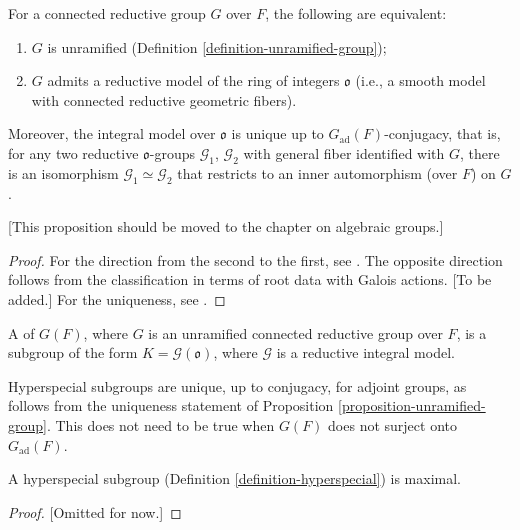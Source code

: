\begin{proposition}
 \label{proposition-unramified-group}
For a connected reductive group $G$ over $F$, the following are equivalent:
\begin{enumerate}
 \item $G$ is unramified (Definition \ref{definition-unramified-group});
 \item $G$ admits a reductive model of the ring of integers $\mathfrak o$ (i.e., a smooth model with connected reductive geometric fibers).
\end{enumerate}
Moreover, the integral model over $\mathfrak o$ is unique up to $G_{\text{ad}}(F)$-conjugacy, that is, for any two reductive $\mathfrak o$-groups $\mathcal G_1$, $\mathcal G_2$ with general fiber identified with $G$, there is an isomorphism $\mathcal G_1 \simeq \mathcal G_2$ that restricts to an inner automorphism (over $F$) on $G$.
\end{proposition}

[This proposition should be moved to the chapter on algebraic groups.]

\begin{proof}
 For the direction from the second to the first, see \cite[Corollary 5.2.14]{Conrad-RGS}. The opposite direction follows from the classification in terms of root data with Galois actions. [To be added.] For the uniqueness, see \cite[Theorem 7.2.16]{Conrad-RGS}.
\end{proof}


\begin{definition}
 \label{definition-hyperspecial}
A  of $G(F)$, where $G$ is an unramified connected reductive group over $F$, is a subgroup of the form $K = \mathcal G (\mathfrak o)$, where $\mathcal G$ is a reductive integral model.
\end{definition}

Hyperspecial subgroups are unique, up to conjugacy, for adjoint groups, as follows from the uniqueness statement of Proposition \ref{proposition-unramified-group}. This does not need to be true when $G(F)$ does not surject onto $G_{\text{ad}}(F)$.

\begin{proposition}
 \label{proposition-hyperspecial-maximal}
A hyperspecial subgroup (Definition \ref{definition-hyperspecial}) is maximal.
\end{proposition}

\begin{proof}
 
 [Omitted for now.]
\end{proof}


